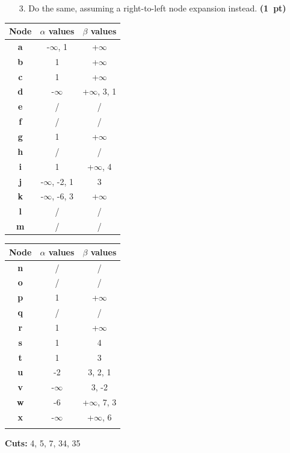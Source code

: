 \documentclass[11pt,a4paper]{report}
\begin{document}
\begin{enumerate}
\item[3.] Do the same, assuming a right-to-left node expansion instead.  \textbf{(1~pt)}
\end{enumerate}

\begin{answers}[8cm]
      \begin{multicols}{2}
      \begin{tabular}{ccc}
      Node & $\alpha$ values & $\beta$ values\\
      \hline
      \textbf{a} & -$\infty$, 1 & +$\infty$ \\ %
      \textbf{b} & 1 & +$\infty$ \\
      \textbf{c} & 1 & +$\infty$ \\
      \textbf{d} & -$\infty$ & +$\infty$, 3, 1 \\
      \textbf{e} & / & / \\
      \textbf{f} & / & / \\
      \textbf{g} & 1 & +$\infty$ \\
      \textbf{h} & / & / \\
      \textbf{i} & 1 & +$\infty$, 4 \\
      \textbf{j} & -$\infty$, -2, 1 & 3 \\
      \textbf{k} & -$\infty$, -6, 3 & +$\infty$ \\
      \textbf{l} & / & / \\
      \textbf{m} & / & / \\ 
      \end{tabular}
      
      \begin{tabular}{ccc}
      Node & $\alpha$ values & $\beta$ values\\
      \hline
      \textbf{n} & / & / \\
      \textbf{o} & / & / \\
      \textbf{p} & 1 & +$\infty$ \\
      \textbf{q} & / & / \\
      \textbf{r} & 1 & +$\infty$ \\
      \textbf{s} & 1 & 4 \\
      \textbf{t} & 1 & 3 \\
      \textbf{u} & -2 & 3, 2, 1 \\
      \textbf{v} & -$\infty$ & 3, -2 \\
      \textbf{w} & -6 & +$\infty$, 7, 3 \\
      \textbf{x} & -$\infty$ & +$\infty$, 6 \\
       &  &  \\
      \end{tabular}
      \end{multicols}
      
\textbf{Cuts:} 4, 5, 7, 34, 35 %
\end{answers}
\end{document}
